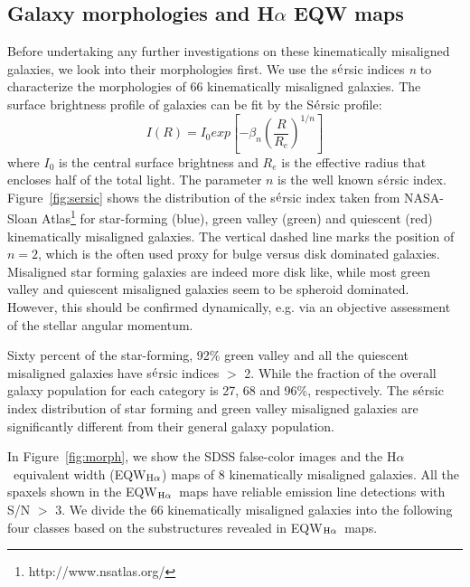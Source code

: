 \documentclass[a4paper,fleqn,usenatbib]{mnras}
\newcommand{\ha}{H$\alpha$}
\newcommand{\ewhae}{\rm{EQW$_{\rm H\alpha}$}}
\begin{document}
\subsection{Galaxy morphologies and H$\alpha$ EQW maps} \label{sec:morphology}

Before undertaking any further investigations on these kinematically misaligned galaxies, we look into their morphologies first. 
We use the s$\acute{\rm e}$rsic indices \emph{n} \citep{sersic-1963, sersic-1968} to characterize the morphologies of 66 kinematically misaligned galaxies. 
The surface brightness profile of galaxies can be fit by the S$\acute{\rm e}$rsic profile:
\begin{equation} \label{equ:sersic}
I(R) = I_{0}exp \left[-\beta_{n} {\left(\frac{R}{R_e}\right)}^{1/n}\right]
\end{equation}
where $I_{0}$ is the central surface brightness and $R_e$ is the effective radius that encloses half of the total light. 
The parameter $n$ is the well known s$\acute{\rm e}$rsic index. Figure~\ref{fig:sersic} shows the distribution of the 
s$\acute{\rm e}$rsic index taken from NASA-Sloan Atlas\citep{abazajian-2009,blanton-2011}\footnote{ http://www.nsatlas.org/} 
for star-forming (blue), green valley (green) and quiescent (red) kinematically misaligned galaxies.
The vertical dashed line marks the position of $n=2$, which is the often used proxy for bulge versus disk dominated galaxies. 
Misaligned star forming galaxies are indeed more disk like, while most green valley and quiescent misaligned galaxies seem to be spheroid dominated. However, this should be confirmed dynamically, e.g. via an objective assessment of the stellar angular momentum.

Sixty percent of the star-forming, 92\% green valley and all the quiescent misaligned galaxies have s$\acute{\rm e}$rsic indices $>$ 2. While the fraction of the overall galaxy population for each category is 27, 68 and 96\%, respectively. The s$\acute{\rm e}$rsic index distribution of star forming and green valley misaligned galaxies are significantly different from their general galaxy population.

In Figure~\ref{fig:morph}, we show the SDSS false-color images and the \ha\ equivalent width (\ewhae ) maps of 8 kinematically misaligned galaxies.
All the spaxels shown in the \ewhae\ maps have reliable emission line detections with S/N $>$ 3. 
We divide the 66 kinematically misaligned galaxies into the following four classes based on the substructures revealed in \ewhae\ maps. 
\end{document}
